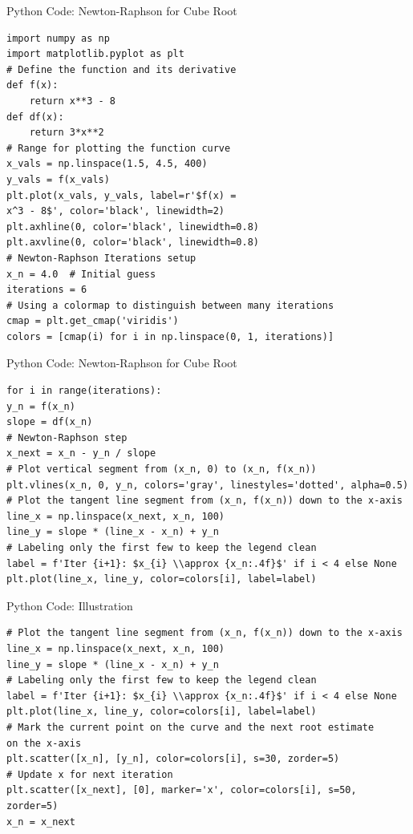 \documentclass{beamer}
\begin{document}
\begin{frame}[fragile]{Python Code: Newton-Raphson for Cube Root}
\begin{lstlisting}import numpy as np
import matplotlib.pyplot as plt
# Define the function and its derivative
def f(x):
    return x**3 - 8
def df(x):
    return 3*x**2
# Range for plotting the function curve
x_vals = np.linspace(1.5, 4.5, 400)
y_vals = f(x_vals)
plt.plot(x_vals, y_vals, label=r'$f(x) = 
x^3 - 8$', color='black', linewidth=2)
plt.axhline(0, color='black', linewidth=0.8)
plt.axvline(0, color='black', linewidth=0.8)
# Newton-Raphson Iterations setup
x_n = 4.0  # Initial guess
iterations = 6
# Using a colormap to distinguish between many iterations
cmap = plt.get_cmap('viridis')
colors = [cmap(i) for i in np.linspace(0, 1, iterations)]
\end{lstlisting}
\end{frame}

\begin{frame}[fragile]{Python Code: Newton-Raphson for Cube Root}
\begin{lstlisting}
for i in range(iterations):
y_n = f(x_n)
slope = df(x_n)
# Newton-Raphson step
x_next = x_n - y_n / slope
# Plot vertical segment from (x_n, 0) to (x_n, f(x_n))
plt.vlines(x_n, 0, y_n, colors='gray', linestyles='dotted', alpha=0.5)
# Plot the tangent line segment from (x_n, f(x_n)) down to the x-axis
line_x = np.linspace(x_next, x_n, 100)
line_y = slope * (line_x - x_n) + y_n
# Labeling only the first few to keep the legend clean
label = f'Iter {i+1}: $x_{i} \\approx {x_n:.4f}$' if i < 4 else None
plt.plot(line_x, line_y, color=colors[i], label=label)
\end{lstlisting}
\end{frame}

\begin{frame}[fragile]{Python Code: Illustration}
\begin{lstlisting}
# Plot the tangent line segment from (x_n, f(x_n)) down to the x-axis
line_x = np.linspace(x_next, x_n, 100)
line_y = slope * (line_x - x_n) + y_n
# Labeling only the first few to keep the legend clean
label = f'Iter {i+1}: $x_{i} \\approx {x_n:.4f}$' if i < 4 else None
plt.plot(line_x, line_y, color=colors[i], label=label)
# Mark the current point on the curve and the next root estimate 
on the x-axis
plt.scatter([x_n], [y_n], color=colors[i], s=30, zorder=5)
# Update x for next iteration
plt.scatter([x_next], [0], marker='x', color=colors[i], s=50, zorder=5)
x_n = x_next
\end{lstlisting}
\end{frame}
\end{document}
